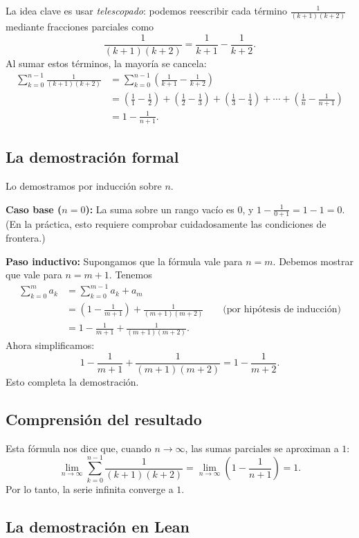 La idea clave es usar \emph{telescopado}: podemos reescribir cada término $\frac{1}{(k+1)(k+2)}$ mediante fracciones parciales como
\[
  \frac{1}{(k+1)(k+2)} = \frac{1}{k+1} - \frac{1}{k+2} .
\]
Al sumar estos términos, la mayoría se cancela:
\begin{align*}
  \sum_{k=0}^{n-1} \frac{1}{(k+1)(k+2)}
  &= \sum_{k=0}^{n-1} \left( \frac{1}{k+1} - \frac{1}{k+2} \right)\\
  &= \left(\frac11 - \frac12\right) + \left(\frac12 - \frac13\right) + \left(\frac13 - \frac14\right) + \cdots + \left(\frac1n - \frac1{n+1}\right)\\
  &= 1 - \frac{1}{n+1} .
\end{align*}

\subsection{La demostración formal}

Lo demostramos por inducción sobre $n$.

\textbf{Caso base ($n=0$):} La suma sobre un rango vacío es $0$, y $1 - \frac{1}{0+1} = 1 - 1 = 0$. (En la práctica, esto requiere comprobar cuidadosamente las condiciones de frontera.)

\textbf{Paso inductivo:} Supongamos que la fórmula vale para $n = m$. Debemos mostrar que vale para $n = m+1$. Tenemos
\begin{align*}
  \sum_{k=0}^{m} a_k &= \sum_{k=0}^{m-1} a_k + a_m\\
  &= \left(1 - \frac{1}{m+1}\right) + \frac{1}{(m+1)(m+2)} \qquad \text{(por hipótesis de inducción)}\\
  &= 1 - \frac{1}{m+1} + \frac{1}{(m+1)(m+2)} .
\end{align*}
Ahora simplificamos:
\[
  1 - \frac{1}{m+1} + \frac{1}{(m+1)(m+2)} = 1 - \frac{1}{m+2} .
\]
Esto completa la demostración.

\subsection{Comprensión del resultado}

Esta fórmula nos dice que, cuando $n \to \infty$, las sumas parciales se aproximan a $1$:
\[
  \lim_{n\to\infty} \sum_{k=0}^{n-1} \frac{1}{(k+1)(k+2)} = \lim_{n\to\infty} \left(1 - \frac{1}{n+1}\right) = 1 .
\]
Por lo tanto, la serie infinita converge a $1$.

\subsection{La demostración en Lean}

